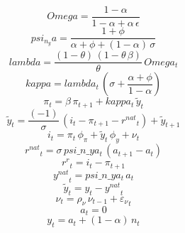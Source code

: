 \documentclass[10pt,a4paper]{article}
\begin{document}
\footnotesize
\begin{dmath*}
Omega = \frac{1-{\alpha}}{1-{\alpha}+{\alpha}\, {\epsilon}}
\end{dmath*}
\begin{dmath*}
psi_n_ya = \frac{1+{\phi}}{{\alpha}+{\phi}+\left(1-{\alpha}\right)\, {\sigma}}
\end{dmath*}
\begin{dmath*}
lambda = \frac{\left(1-{\theta}\right)\, \left(1-{\theta}\, {\beta}\right)}{{\theta}}\, Omega_{t}
\end{dmath*}
\begin{dmath*}
kappa = lambda_{t}\, \left({\sigma}+\frac{{\alpha}+{\phi}}{1-{\alpha}}\right)
\end{dmath*}
\begin{dmath}
{\pi}_{t}={\beta}\, {\pi}_{t+1}+kappa_{t}\, {\tilde y}_{t}
\end{dmath}
\begin{dmath}
{\tilde y}_{t}=\frac{\left(-1\right)}{{\sigma}}\, \left({i}_{t}-{\pi}_{t+1}-{r^{nat}}_{t}\right)+{\tilde y}_{t+1}
\end{dmath}
\begin{dmath}
{i}_{t}={\pi}_{t}\, {\phi_{\pi}}+{\tilde y}_{t}\, {\phi_{y}}+{\nu}_{t}
\end{dmath}
\begin{dmath}
{r^{nat}}_{t}={\sigma}\, psi\_n\_ya_{t}\, \left({a}_{t+1}-{a}_{t}\right)
\end{dmath}
\begin{dmath}
{r^r}_{t}={i}_{t}-{\pi}_{t+1}
\end{dmath}
\begin{dmath}
{y^{nat}}_{t}=psi\_n\_ya_{t}\, {a}_{t}
\end{dmath}
\begin{dmath}
{\tilde y}_{t}={y}_{t}-{y^{nat}}_{t}
\end{dmath}
\begin{dmath}
{\nu}_{t}={\rho_{\nu}}\, {\nu}_{t-1}+{\varepsilon_\nu}_{t}
\end{dmath}
\begin{dmath}
{a}_{t}=0
\end{dmath}
\begin{dmath}
{y}_{t}={a}_{t}+\left(1-{\alpha}\right)\, {n}_{t}
\end{dmath}
\end{document}
